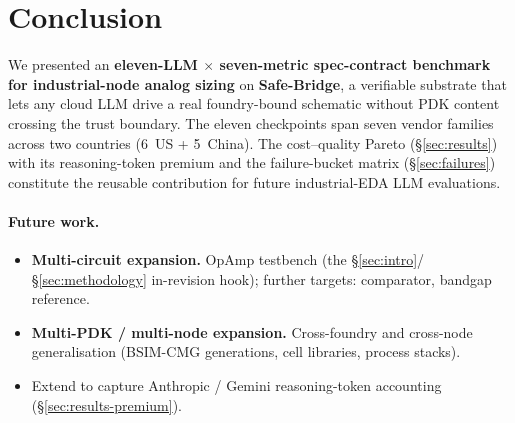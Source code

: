 
\section{Conclusion}
\label{sec:conclusion}

We presented an \textbf{eleven-LLM $\times$ seven-metric
spec-contract benchmark for industrial-node analog sizing} on
\textbf{Safe-Bridge}, a verifiable substrate that lets any cloud
LLM drive a real foundry-bound schematic without PDK content
crossing the trust boundary. The eleven checkpoints span seven
vendor families across two countries (6~US + 5~China). The
cost--quality Pareto
(\S\ref{sec:results}) with its reasoning-token premium and the
failure-bucket matrix (\S\ref{sec:failures}) constitute the
reusable contribution for future industrial-EDA LLM evaluations.

\paragraph{Future work.}
\begin{itemize}
  \item \textbf{Multi-circuit expansion.} OpAmp testbench (the
    \S\ref{sec:intro}/\S\ref{sec:methodology} in-revision hook);
    further targets: comparator, bandgap reference.
  \item \textbf{Multi-PDK / multi-node expansion.} Cross-foundry
    and cross-node generalisation (BSIM-CMG generations, cell
    libraries, process stacks).
  \item Extend  to capture
    Anthropic / Gemini reasoning-token accounting
    (\S\ref{sec:results-premium}).
\end{itemize}
